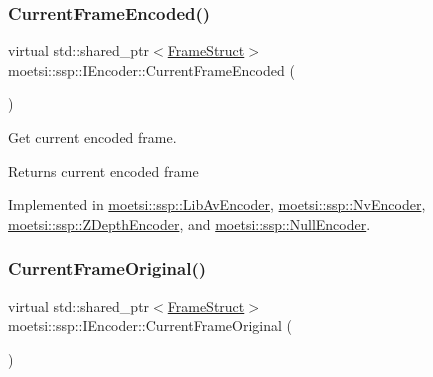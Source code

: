 \mbox{\label{classmoetsi_1_1ssp_1_1IEncoder_a178d117518e7c7007414ea9c82bd3ed6}} 
\subsubsection{\texorpdfstring{Current\+Frame\+Encoded()}{CurrentFrameEncoded()}\hspace{0.1cm}{\footnotesize\ttfamily [2/2]}}
{\footnotesize\ttfamily virtual std\+::shared\+\_\+ptr$<$\hyperlink{structmoetsi_1_1ssp_1_1FrameStruct}{Frame\+Struct}$>$ moetsi\+::ssp\+::\+I\+Encoder\+::\+Current\+Frame\+Encoded (\begin{DoxyParamCaption}{ }\end{DoxyParamCaption})\hspace{0.3cm}{\ttfamily [pure virtual]}}



Get current encoded frame. 

\begin{DoxyReturn}{Returns}
current encoded frame 
\end{DoxyReturn}


Implemented in \hyperlink{classmoetsi_1_1ssp_1_1LibAvEncoder_aedb37703d73b55f1389a122d2ecbe923}{moetsi\+::ssp\+::\+Lib\+Av\+Encoder}, \hyperlink{classmoetsi_1_1ssp_1_1NvEncoder_adbc7d498e797af8c5bb31b5a2a82efdd}{moetsi\+::ssp\+::\+Nv\+Encoder}, \hyperlink{classmoetsi_1_1ssp_1_1ZDepthEncoder_a075752f62bbc40f71026812c5548ef5f}{moetsi\+::ssp\+::\+Z\+Depth\+Encoder}, and \hyperlink{classmoetsi_1_1ssp_1_1NullEncoder_ae48926f99c368849ee8822aed10ac1b5}{moetsi\+::ssp\+::\+Null\+Encoder}.

\mbox{\label{classmoetsi_1_1ssp_1_1IEncoder_ab60bdaae0a85289dfa31a12bab533dc0}} 
\subsubsection{\texorpdfstring{Current\+Frame\+Original()}{CurrentFrameOriginal()}\hspace{0.1cm}{\footnotesize\ttfamily [1/2]}}
{\footnotesize\ttfamily virtual std\+::shared\+\_\+ptr$<$\hyperlink{structmoetsi_1_1ssp_1_1FrameStruct}{Frame\+Struct}$>$ moetsi\+::ssp\+::\+I\+Encoder\+::\+Current\+Frame\+Original (\begin{DoxyParamCaption}{ }\end{DoxyParamCaption})\hspace{0.3cm}{\ttfamily [pure virtual]}}



